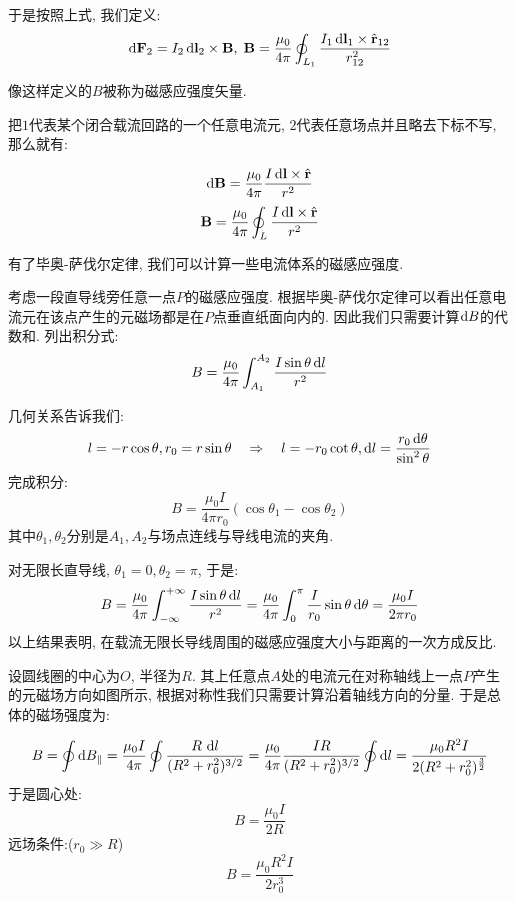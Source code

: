 于是按照上式, 我们定义:
\[
\mathop{}\!\mathrm{d} \mathbf{F}_2 = I_2\mathop{}\!\mathrm{d} \mathbf{l}_2\times \mathbf{B}, \; \mathbf{B} = \frac{\mu_0}{4\pi}\oint_{L_1}\frac{I_1 \mathop{}\!\mathrm{d} \mathbf{l}_1\times {\hat{\mathbf{r}}_{12}}}{r^2_{12}}
\]

像这样定义的$B$被称为磁感应强度矢量.

把$1$代表某个闭合载流回路的一个任意电流元, $2$代表任意场点并且略去下标不写, 那么就有:
\begin{theorem}[毕奥-萨伐尔定律]
\[
\mathop{}\!\mathrm{d} \mathbf{B}=  \frac{\mu_0}{4\pi}
\frac{I \mathop{}\!\mathrm{d} \mathbf{l}\times {\hat{\mathbf{r}}}}{r^2}
\]
\[
\mathbf{B} = \frac{\mu_0}{4\pi}
\oint_L \frac{I \mathop{}\!\mathrm{d} \mathbf{l}\times {\hat{\mathbf{r}}}}{r^2}
\]
\end{theorem}

有了毕奥-萨伐尔定律, 我们可以计算一些电流体系的磁感应强度.

\begin{example}
考虑一段直导线旁任意一点$P$的磁感应强度. 根据毕奥-萨伐尔定律可以看出任意电流元在该点产生的元磁场都是在$P$点垂直纸面向内的. 因此我们只需要计算$\mathop{}\!\mathrm{d} B$的代数和. 列出积分式:
\[
B = \frac{\mu_0}{4\pi}\int_{A_1}^{A_2}\frac{I\sin\theta\mathop{}\!\mathrm{d} l}{r^2}
\]

几何关系告诉我们:
\[
l=-r\cos\theta,r_0=r\sin\theta\quad\Rightarrow\quad l=-r_0\cot\theta,\mathop{}\!\mathrm{d} l = \frac{r_0 \mathop{}\!\mathrm{d}\theta}{\sin^2\theta}
\]
完成积分:
\[
B = \frac{\mu_0 I}{4\pi r_0}(\cos\theta_1-\cos\theta_2)
\]
其中$\theta_1,\theta_2$分别是$A_1,A_2$与场点连线与导线电流的夹角.

对无限长直导线, $\theta_1=0,\theta_2=\pi$, 于是:
\[
B = \frac{\mu_0}{4\pi}\int_{-\infty}^{+\infty}\frac{I\sin\theta\mathop{}\!\mathrm{d} l}{r^2}=\frac{\mu_0}{4\pi}\int_0^\pi\frac{I}{r_0}\sin \theta\mathop{}\!\mathrm{d}\theta=\frac{\mu_0 I}{2\pi r_0}
\]
以上结果表明, 在载流无限长导线周围的磁感应强度大小与距离的一次方成反比.

\end{example}

\begin{example}
设圆线圈的中心为$O$, 半径为$R$. 其上任意点$A$处的电流元在对称轴线上一点$P$产生的元磁场方向如图所示, 根据对称性我们只需要计算沿着轴线方向的分量. 于是总体的磁场强度为:

\[
B=\oint\mathop{}\!\mathrm{d} B_{\parallel}=\frac{\mu_0 I}{4\pi}\oint\frac{R\,\mathop{}\!\mathrm{d} l}{(R^2+r_0^2)^{3/2}}= \frac{\mu_0}{4\pi}\frac{IR}{(R^2+r_0^2)^{3/2}}\oint \mathop{}\!\mathrm{d} l =\frac{\mu_0R^2I}{2(R^2+r_0^2)^{\frac{3}{2}}}
\]
于是圆心处:
\[
B=\frac{\mu_0 I}{2R}
\]
远场条件:($r_0 \gg R$)
\[
B=\frac{\mu_0R^2I}{2r_0^3}
\]
\end{example}

